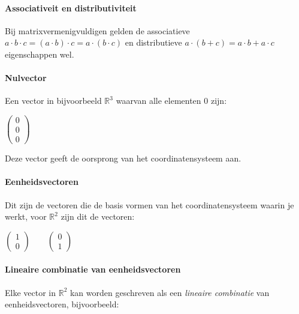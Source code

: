 \documentclass[11pt]{article}
\begin{document}
    \hypertarget{associativeit-en-distributiviteit}{%
\paragraph{Associativeit en
distributiviteit}\label{associativeit-en-distributiviteit}}

    Bij matrixvermenigvuldigen gelden de associatieve
\(a \cdot b \cdot c = (a \cdot b) \cdot c = a \cdot (b \cdot c)\) en
distributieve \(a \cdot (b + c) = a\cdot b + a \cdot c\) eigenschappen
wel.

    \hypertarget{nulvector}{%
\paragraph{Nulvector}\label{nulvector}}

    Een vector in bijvoorbeeld \(\mathbb{R}^3\) waarvan alle elementen \(0\)
zijn:

\(\begin{pmatrix} 0 \\ 0 \\ 0\end{pmatrix}\)

Deze vector geeft de oorsprong van het coordinatensysteem aan.

    \hypertarget{eenheidsvectoren}{%
\paragraph{Eenheidsvectoren}\label{eenheidsvectoren}}

    Dit zijn de vectoren die de basis vormen van het coordinatensysteem
waarin je werkt, voor \(\mathbb{R}^2\) zijn dit de vectoren:

\(\begin{pmatrix} 1 \\ 0\end{pmatrix} \qquad \begin{pmatrix} 0 \\ 1\end{pmatrix}\)

    \hypertarget{lineaire-combinatie-van-eenheidsvectoren}{%
\paragraph{Lineaire combinatie van
eenheidsvectoren}\label{lineaire-combinatie-van-eenheidsvectoren}}

    Elke vector in \(\mathbb{R}^2\) kan worden geschreven als een
\emph{lineaire combinatie} van eenheidsvectoren, bijvoorbeeld:
\end{document}
